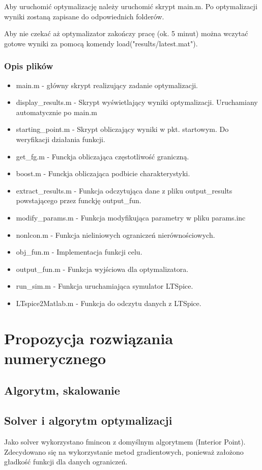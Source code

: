 \documentclass{article}
\begin{document}
Aby uruchomić optymalizację należy uruchomić skrypt main.m. Po optymalizacji wyniki zostaną zapisane do odpowiednich folderów.

Aby nie czekać aż optymalizator zakończy pracę (ok. 5 minut) można wczytać gotowe wyniki za pomocą komendy load("results/latest.mat").

\subsubsection*{Opis plików}
\begin{itemize}
	\item main.m - główny skrypt realizujący zadanie optymalizacji.
	\item display\_results.m - Skrypt wyświetlający wyniki optymalizacji. Uruchamiany automatycznie po main.m
	\item starting\_point.m - Skrypt obliczający wyniki w pkt. startowym. Do weryfikacji działania funkcji.
	\item get\_fg.m - Funckja obliczająca częstotliwość graniczną.
	\item boost.m - Funckja obliczająca podbicie charakterystyki.
	\item extract\_results.m - Funkcja odczytująca dane z pliku output\_results powstającego przez funckję output\_fun.
	\item modify\_params.m - Funkcja modyfikująca parametry w pliku params.inc
	\item nonlcon.m - Funkcja nieliniowych ograniczeń nierównościowych.
	\item obj\_fun.m - Implementacja funkcji celu.
	\item output\_fun.m - Funkcja wyjściowa dla optymalizatora.
	\item run\_sim.m - Funkcja uruchamiająca symulator LTSpice.
	\item LTspice2Matlab.m - Funkcja do odczytu danych z LTSpice.
\end{itemize}

\section{Propozycja rozwiązania numerycznego}
\subsection{Algorytm, skalowanie}
\subsection*{Solver i algorytm optymalizacji}
Jako solver wykorzystano fmincon z domyślnym algorytmem (Interior Point). Zdecydowano się na wykorzystanie
metod gradientowych, ponieważ założono gładkość funkcji dla danych ograniczeń.
\end{document}
